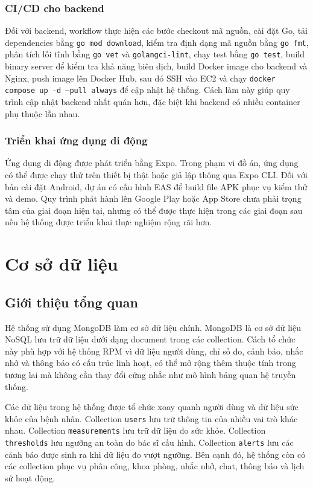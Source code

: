 \subsubsection{CI/CD cho backend}
\par Đối với backend, workflow thực hiện các bước checkout mã nguồn, cài đặt Go, tải dependencies bằng \texttt{go mod download}, kiểm tra định dạng mã nguồn bằng \texttt{go fmt}, phân tích lỗi tĩnh bằng \texttt{go vet} và \texttt{golangci-lint}, chạy test bằng \texttt{go test}, build binary server để kiểm tra khả năng biên dịch, build Docker image cho backend và Nginx, push image lên Docker Hub, sau đó SSH vào EC2 và chạy \texttt{docker compose up -d --pull always} để cập nhật hệ thống. Cách làm này giúp quy trình cập nhật backend nhất quán hơn, đặc biệt khi backend có nhiều container phụ thuộc lẫn nhau.

\subsubsection{Triển khai ứng dụng di động}
\par Ứng dụng di động được phát triển bằng Expo. Trong phạm vi đồ án, ứng dụng có thể được chạy thử trên thiết bị thật hoặc giả lập thông qua Expo CLI. Đối với bản cài đặt Android, dự án có cấu hình EAS để build file APK phục vụ kiểm thử và demo. Quy trình phát hành lên Google Play hoặc App Store chưa phải trọng tâm của giai đoạn hiện tại, nhưng có thể được thực hiện trong các giai đoạn sau nếu hệ thống được triển khai thực nghiệm rộng rãi hơn.

\section{Cơ sở dữ liệu}

\subsection{Giới thiệu tổng quan}
\par Hệ thống sử dụng MongoDB làm cơ sở dữ liệu chính. MongoDB là cơ sở dữ liệu NoSQL lưu trữ dữ liệu dưới dạng document trong các collection. Cách tổ chức này phù hợp với hệ thống RPM vì dữ liệu người dùng, chỉ số đo, cảnh báo, nhắc nhở và thông báo có cấu trúc linh hoạt, có thể mở rộng thêm thuộc tính trong tương lai mà không cần thay đổi cứng nhắc như mô hình bảng quan hệ truyền thống. \cite{mongodbcollections}

\par Các dữ liệu trong hệ thống được tổ chức xoay quanh người dùng và dữ liệu sức khỏe của bệnh nhân. Collection \texttt{users} lưu trữ thông tin của nhiều vai trò khác nhau. Collection \texttt{measurements} lưu trữ dữ liệu đo sức khỏe. Collection \texttt{thresholds} lưu ngưỡng an toàn do bác sĩ cấu hình. Collection \texttt{alerts} lưu các cảnh báo được sinh ra khi dữ liệu đo vượt ngưỡng. Bên cạnh đó, hệ thống còn có các collection phục vụ phân công, khoa phòng, nhắc nhở, chat, thông báo và lịch sử hoạt động.

